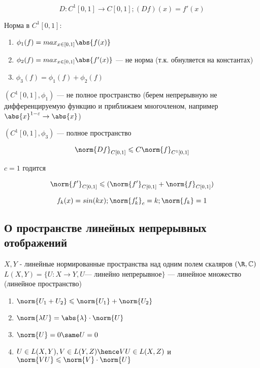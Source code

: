 \begin{example}
    \[
        D: C^1[0, 1] \to C[0, 1]; (Df)(x) = f'(x)
    \]

    Норма в $C^1[0, 1]$:

    \begin{enumerate}
        \item $
            \phi_1(f) = max_{x \in [0, 1]} \abs{f(x)}  
        $ 
        \item $
            \phi_2(f) = max_{x \in [0, 1]} \abs{f'(x)}  
        $ --- не норма (т.к. обнуляется на константах)
        \item $
            \phi_3(f) = \phi_1(f) + \phi_2(f)
        $
    \end{enumerate}

    $(C^1[0, 1], \phi_1)$ --- не полное пространство (берем непрерывную не дифференцируемую функцию и приближаем многочленом, например $\abs{x} ^ {1 - \varepsilon} \to \abs{x} $)

    \exercise  $(C^1[0, 1], \phi_3)$ --- полное пространство


    \[
        \norm{Df}_{C[0, 1]} \leqslant C \norm{f}_{C^1 [0,1]}
    \]

    $c = 1$ годится

    \[
        \norm{f'}_{C[0, 1]} \leqslant (\norm{f'}_{C[0,1]} + \norm{f}_{C[0, 1]})
    \]

    \[
        f_k(x) = sin(kx);
        \norm{f'_k}_c = k;
        \norm{f_k} = 1
    \]
\end{example}

\subsection{О пространстве линейных непрерывных отображений}
\begin{theorem}
    $X, Y$ - линейные нормированные пространства над одним полем скаляров $(\R, \mathbb{C})$ \\ $L(X, Y) = \{ U : X \to Y, U \text{--- линейно непрерывное} \}$ --- линейное множество (линейное пространство)

    \begin{enumerate}
        \item $\norm{U_1 + U_2} \leqslant \norm{U_1} + \norm{U_2}$
        \item $\norm{\lambda U} = \abs{\lambda} \cdot \norm{U}$
        \item $\norm{U} = 0 \same U = 0$
        \item $U \in L(X, Y), V \in L(Y, Z) \hence VU \in L(X, Z)$ и $\norm{VU} \leqslant \norm{V} \cdot \norm{U}$
    \end{enumerate}
\end{theorem}



